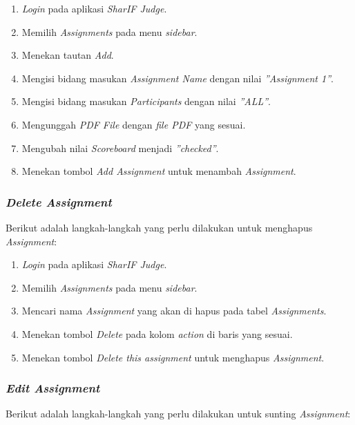 \begin{enumerate}
	\item \textit{Login} pada aplikasi \textit{SharIF Judge}.
	\item Memilih \textit{Assignments} pada menu \textit{sidebar}.
	\item Menekan tautan \textit{Add}.
	\item Mengisi bidang masukan \textit{Assignment Name} dengan nilai \textit{''Assignment 1''}.
	\item Mengisi bidang masukan \textit{Participants} dengan nilai \textit{''ALL''}.
	\item Mengunggah \textit{PDF File} dengan \textit{file PDF} yang sesuai.
	\item Mengubah nilai \textit{Scoreboard} menjadi \textit{''checked''}.
	\item Menekan tombol \textit{Add Assignment} untuk menambah \textit{Assignment}.
\end{enumerate}

\subsubsection{\textit{Delete Assignment}}
\label{subsubsec:skenario_delete_assignment}
Berikut adalah langkah-langkah yang perlu dilakukan untuk menghapus \textit{Assignment}:

\begin{enumerate}
	\item \textit{Login} pada aplikasi \textit{SharIF Judge}.
	\item Memilih \textit{Assignments} pada menu \textit{sidebar}.
	\item Mencari nama \textit{Assignment} yang akan di hapus pada tabel \textit{Assignments}.
	\item Menekan tombol \textit{Delete} pada kolom \textit{action} di baris yang sesuai.
	\item Menekan tombol \textit{Delete this assignment} untuk menghapus \textit{Assignment}.
\end{enumerate}

\subsubsection{\textit{Edit Assignment}}
\label{subsubsec:skenario_edit_assignment}
Berikut adalah langkah-langkah yang perlu dilakukan untuk sunting \textit{Assignment}:

